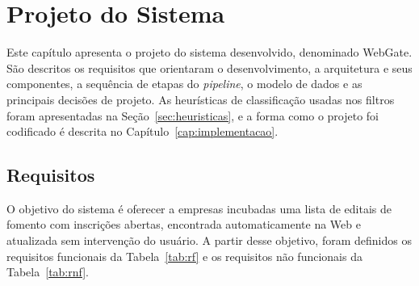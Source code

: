 \chapter[PROJETO DO SISTEMA]{Projeto do Sistema}
\label{cap:projeto}

Este capítulo apresenta o projeto do sistema desenvolvido, denominado WebGate.
São descritos os requisitos que orientaram o desenvolvimento, a arquitetura e
seus componentes, a sequência de etapas do \textit{pipeline}, o modelo de dados
e as principais decisões de projeto. As heurísticas de classificação usadas nos
filtros foram apresentadas na Seção~\ref{sec:heuristicas}, e a forma como o
projeto foi codificado é descrita no Capítulo~\ref{cap:implementacao}.

\section{Requisitos}
\label{sec:requisitos}

O objetivo do sistema é oferecer a empresas incubadas uma lista de editais de
fomento com inscrições abertas, encontrada automaticamente na Web e atualizada
sem intervenção do usuário. A partir desse objetivo, foram definidos os
requisitos funcionais da Tabela~\ref{tab:rf} e os requisitos não funcionais da
Tabela~\ref{tab:rnf}.

